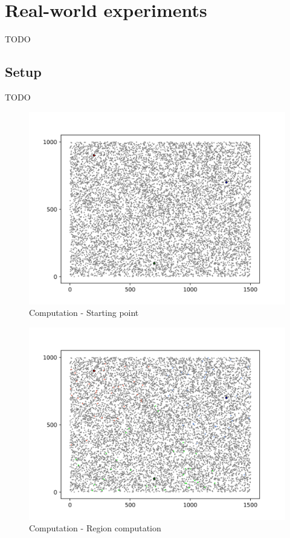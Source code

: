 \section{Real-world experiments}
TODO

\subsection{Setup}
TODO

\begin{figure}[!ht]
    \centering
    \includegraphics[width=\linewidth]{document/chapters/chapter_7/images/computation_start.png}
    \caption{Computation - Starting point}
    \label{fig:computation_start}
\end{figure}

\begin{figure}[!ht]
    \centering
    \includegraphics[width=\linewidth]{document/chapters/chapter_7/images/computation_region_computation.png}
    \caption{Computation - Region computation}
    \label{fig:computation_region_computation}
\end{figure}

